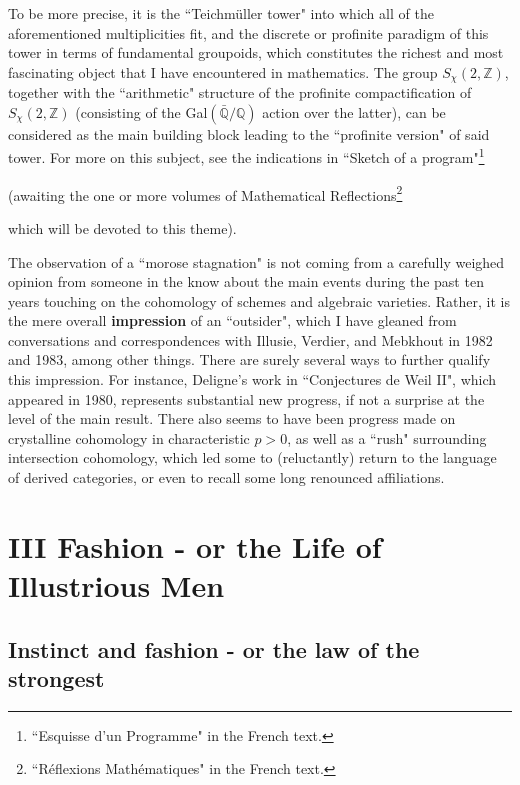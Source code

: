 \label{note:47.2} To be more precise, it is the ``Teichm\"uller tower" into which all of the aforementioned multiplicities fit, and the discrete or profinite paradigm of this tower in terms of fundamental groupoids, which constitutes the richest and most fascinating object that I have encountered in mathematics. The group $S_\chi(2, \mathbb{Z})$, together with the ``arithmetic" structure of the profinite compactification of $S_\chi(2, \mathbb{Z})$ (consisting of the Gal$(\bar{\mathbb{Q}}/\mathbb{Q})$ action over the latter), can be considered as the main building block leading to the ``profinite version" of said tower.
For more on this subject, see the indications in ``Sketch of a program"\footnote{``Esquisse d'un Programme" in the French text.}
\addtocounter{footnote}{-1} (awaiting the one or more volumes of Mathematical Reflections\footnote{``R\'eflexions Math\'ematiques" in the French text.}
\addtocounter{footnote}{-1} which will be devoted to this theme).

\label{note:47.3} The observation of a ``morose stagnation" is not coming from a carefully weighed opinion from someone in the know about the main events during the past ten years touching on the cohomology of schemes and algebraic varieties. Rather, it is the mere overall \textbf{impression} of an ``outsider", which I have gleaned from conversations and correspondences with Illusie, Verdier, and Mebkhout in 1982 and 1983, among other things. There are surely several ways to further qualify this impression. For instance, Deligne's work in ``Conjectures de Weil II", which appeared in 1980, represents substantial new progress, if not a surprise at the level of the main result. There also seems to have been progress made on crystalline cohomology in characteristic $p > 0$, as well as a ``rush" surrounding intersection cohomology, which led some to (reluctantly) return to the language of derived categories, or even to recall some long renounced affiliations.

\section{III Fashion - or the Life of Illustrious Men}

\subsection{Instinct and fashion - or the law of the strongest}

